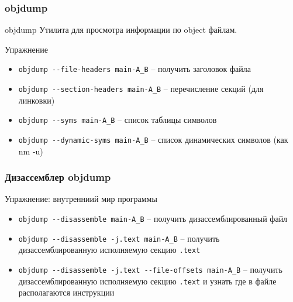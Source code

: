 
\begin{frame}
	\frametitle{objdump}

	\begin{block}{objdump}
		Утилита для просмотра информации по object файлам.
	\end{block}

	\pause

	\begin{block}{Упражнение}
		\begin{itemize}
			\item {\tt objdump -{}-file-headers main-A\_B} -- получить заголовок файла
			\item {\tt objdump -{}-section-headers main-A\_B} -- перечисление секций (для линковки)
			\item {\tt objdump -{}-syms main-A\_B} -- список таблицы символов
			\item {\tt objdump -{}-dynamic-syms main-A\_B} -- список динамических символов (как nm -u)
		\end{itemize}

	\end{block}
\end{frame}


\begin{frame}
	\frametitle{Дизассемблер objdump}

	\begin{block}{Упражнение: внутренниий мир программы}
		\begin{itemize}
			\item {\tt objdump -{}-disassemble main-A\_B} -- получить дизассемблированный файл
			\item {\tt objdump -{}-disassemble -j.text main-A\_B} -- 
				получить дизассемблированную исполняемую секцию {\tt .text}
			\item {\tt objdump -{}-disassemble -j.text -{}-file-offsets main-A\_B} -- 
				получить дизассемблированную исполняемую секцию {\tt .text} 
				и узнать где в файле располагаются инструкции
		\end{itemize}
	\end{block}
\end{frame}

